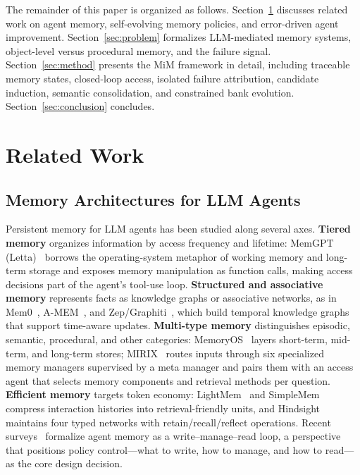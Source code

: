 \documentclass[11pt]{article}
\begin{document}
The remainder of this paper is organized as follows. Section~\ref{sec:related}
discusses related work on agent memory, self-evolving memory policies, and
error-driven agent improvement. Section~\ref{sec:problem} formalizes
LLM-mediated memory systems, object-level versus procedural memory, and the
failure signal. Section~\ref{sec:method} presents the MiM framework in detail,
including traceable memory states, closed-loop access, isolated failure
attribution, candidate induction, semantic consolidation, and constrained bank
evolution. Section~\ref{sec:conclusion} concludes.

\section{Related Work}
\label{sec:related}

\subsection{Memory Architectures for LLM Agents}
\label{sec:rw-arch}

Persistent memory for LLM agents has been studied along several axes. \textbf{Tiered
memory} organizes information by access frequency and lifetime: MemGPT
(Letta)~\cite{packer2023memgpt} borrows the operating-system metaphor of
working memory and long-term storage and exposes memory manipulation as function
calls, making access decisions part of the agent's tool-use loop. \textbf{Structured
and associative memory} represents facts as knowledge graphs or associative
networks, as in Mem0~\cite{chattopadhyay2025mem0}, A-MEM~\cite{zhang2025amem},
and Zep/Graphiti~\cite{zhu2025graphiti}, which build temporal knowledge graphs
that support time-aware updates. \textbf{Multi-type memory} distinguishes
episodic, semantic, procedural, and other categories: MemoryOS~\cite{chen2025memoryos}
layers short-term, mid-term, and long-term stores; MIRIX~\cite{vlasic2025mirix}
routes inputs through six specialized memory managers supervised by a meta
manager and pairs them with an access agent that selects memory components and
retrieval methods per question. \textbf{Efficient memory} targets token economy:
LightMem~\cite{luo2025lightmem} and SimpleMem~\cite{liu2026simplemem} compress
interaction histories into retrieval-friendly units, and Hindsight~\cite{van2025hindsight}
maintains four typed networks with retain/recall/reflect operations. Recent
surveys~\cite{du2026survey} formalize agent memory as a write--manage--read
loop, a perspective that positions policy control---what to write, how to manage,
and how to read---as the core design decision.
\end{document}
